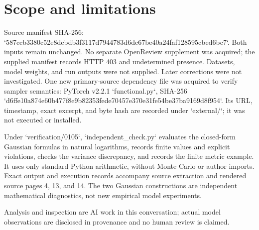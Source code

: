 \documentclass[10pt]{article}
\begin{document}
\section*{Scope and limitations}
Source manifest SHA-256: `587ccb3380c52e8dcbdb3f3117d7944783d6dc67be40a24faf128595cbed6bc7`. Both inputs remain unchanged. No separate OpenReview supplement was acquired; the supplied manifest records HTTP 403 and undetermined presence. Datasets, model weights, and run outputs were not supplied. Later corrections were not investigated. One new primary-source dependency file was acquired to verify sampler semantics: PyTorch v2.2.1 `functional.py`, SHA-256 `d6ffe10a874e60b477f8e9b82353fede70457e370e31fe54be37ba9169d8f954`. Its URL, timestamp, exact excerpt, and byte hash are recorded under `external/`; it was not executed or installed.\par
Under `verification/0105`, `independent\_check.py` evaluates the closed-form Gaussian formulas in natural logarithms, records finite values and explicit violations, checks the variance discrepancy, and records the finite metric example. It uses only standard Python arithmetic, without Monte Carlo or author imports. Exact output and execution records accompany source extraction and rendered source pages 4, 13, and 14. The two Gaussian constructions are independent mathematical diagnostics, not new empirical model experiments.\par
Analysis and inspection are AI work in this conversation; actual model observations are disclosed in provenance and no human review is claimed.\par
\end{document}
